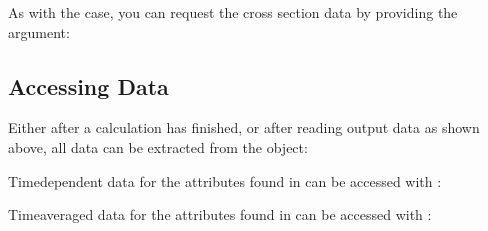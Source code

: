 \documentclass[letterpaper,10pt,english,openany,oneside]{sphinxmanual}
\begin{document}
\sphinxAtStartPar
As with the {\hyperref[\detokenize{ext_guide:reading-a-single-calculation}]{}} case,
you can request the cross section data by providing the 
argument:

\begin{sphinxVerbatim}[commandchars=\\\{\}]
 

   

\PYG{p}{[}\PYG{p}{]}
\end{sphinxVerbatim}


\subsection{Accessing Data}
\label{\detokenize{ext_guide:accessing-data}}
\sphinxAtStartPar
Either after a calculation has finished, or after reading output data as shown
above, all data can be extracted from the {\hyperref[\detokenize{api/pytb.ThunderBoltz:pytb.ThunderBoltz}]{}} object:

\sphinxAtStartPar
Time\sphinxhyphen{}dependent data for the attributes found in
{\hyperref[\detokenize{api/pytb.parameters.OutputParameters:pytb.parameters.OutputParameters}]{}} can be accessed with
{\hyperref[\detokenize{api/pytb.ThunderBoltz.get_timeseries:pytb.ThunderBoltz.get_timeseries}]{}}:

\begin{sphinxVerbatim}[commandchars=\\\{\}]
  
\end{sphinxVerbatim}

\sphinxAtStartPar
Time\sphinxhyphen{}averaged data for the attributes found in
{\hyperref[\detokenize{api/pytb.parameters.OutputParameters:pytb.parameters.OutputParameters}]{}} can be accessed with
{\hyperref[\detokenize{api/pytb.ThunderBoltz.get_ss_params:pytb.ThunderBoltz.get_ss_params}]{}}:
\end{document}
